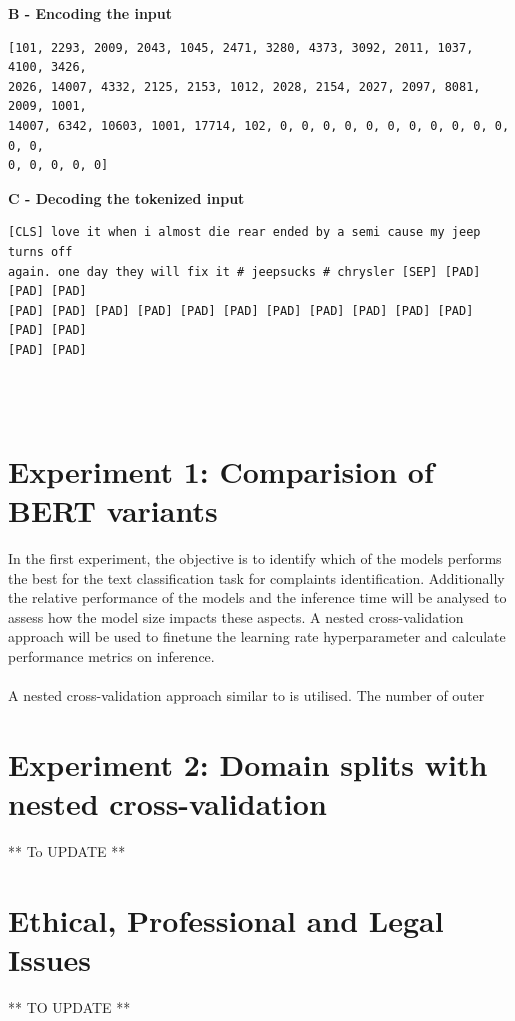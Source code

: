 \textbf{B - Encoding the input}\newline

\begin{adjustbox}{minipage={\textwidth},fbox}
    \begin{verbatim}[101, 2293, 2009, 2043, 1045, 2471, 3280, 4373, 3092, 2011, 1037, 4100, 3426, 
2026, 14007, 4332, 2125, 2153, 1012, 2028, 2154, 2027, 2097, 8081, 2009, 1001, 
14007, 6342, 10603, 1001, 17714, 102, 0, 0, 0, 0, 0, 0, 0, 0, 0, 0, 0, 0, 0, 
0, 0, 0, 0, 0]\end{verbatim}
\end{adjustbox} \newline\newline

\textbf{C - Decoding the tokenized input}\newline

\begin{adjustbox}{minipage={\textwidth},fbox}
    \begin{verbatim}[CLS] love it when i almost die rear ended by a semi cause my jeep turns off 
again. one day they will fix it # jeepsucks # chrysler [SEP] [PAD] [PAD] [PAD] 
[PAD] [PAD] [PAD] [PAD] [PAD] [PAD] [PAD] [PAD] [PAD] [PAD] [PAD] [PAD] [PAD] 
[PAD] [PAD]\end{verbatim}
\end{adjustbox}\\ \\

\section{Experiment 1: Comparision of BERT variants}
In the first experiment, the objective is to identify which of the models performs the best for the text classification task for complaints identification. Additionally the relative performance of the models and the inference time will be analysed to assess how the model size impacts these aspects.  A nested cross-validation approach will be used to finetune the learning rate hyperparameter and calculate performance metrics on inference. \\ \\

A nested cross-validation approach similar to \cite{preotiuc-pietro_automatically_2019} is utilised. The number of outer 



\section{Experiment 2: Domain splits with nested cross-validation}
** To UPDATE **

\section{Ethical, Professional and Legal Issues}
** TO UPDATE **
